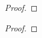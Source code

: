 \begin{exercise}{62}
    
\end{exercise}
\begin{solution}
    \begin{proof}
        
    \end{proof}
\end{solution}

\begin{exercise}{63}
    
\end{exercise}
\begin{solution}
    \begin{proof}
        
    \end{proof}
\end{solution}